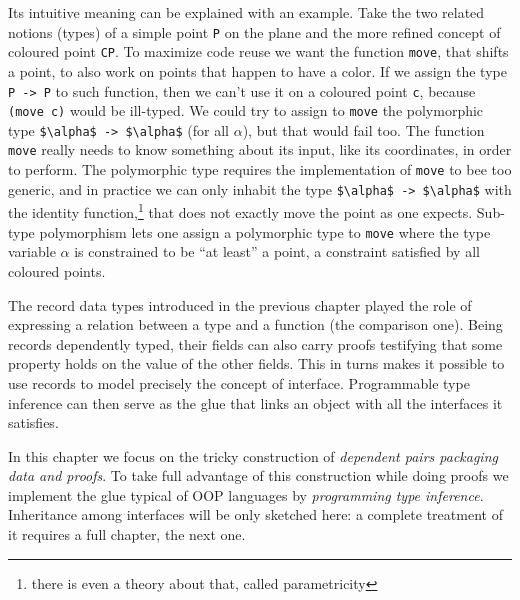 Its intuitive meaning can be explained with an example.  Take the two
related notions (types) of a simple point \lstinline/P/ on the plane
and the more refined concept of coloured point \lstinline/CP/.  To
maximize code reuse we want the function \lstinline/move/, that shifts
a point, to also work on points that happen to have a color.
If we assign the type \lstinline/P -> P/ to such function, then we
can't use it on a coloured point \lstinline/c/, because
\lstinline/(move c)/ would be ill-typed.
We could try to assign to \lstinline/move/ the polymorphic type
\lstinline/$\alpha$ -> $\alpha$/ (for all $\alpha$), but that would
fail too. The function \lstinline/move/ really needs to know something
about its input, like its coordinates, in order to perform.  The
polymorphic type requires the implementation of \lstinline/move/
to bee too generic, and
in practice we can only inhabit the type
\lstinline/$\alpha$ -> $\alpha$/ with the identity
function,\footnote{there is even a theory about that, called
parametricity} that does not exactly move the point as one expects.
Sub-type polymorphism lets one assign a polymorphic type to
\lstinline/move/ where the type variable $\alpha$ is constrained to be
``at least'' a point, a constraint satisfied by all coloured points.

The record data types introduced in the previous chapter played the
role of expressing a relation between a type and a function (the
comparison one).  Being records dependently typed, their fields can
also carry proofs testifying that some property holds on the value of
the other fields.  This in turns makes it possible to use records to
model precisely the concept of interface.  Programmable type inference
can then serve as the glue that links an object with all the
interfaces it satisfies.

In this chapter we focus on the tricky construction of
\emph{dependent pairs packaging data and proofs}.  To take
full advantage of this construction while doing proofs we
implement the glue typical of OOP languages by \emph{programming
type inference}.
Inheritance among interfaces will be only sketched here: a complete
treatment of it requires a full chapter, the next one.

\mcbNOTES{}

